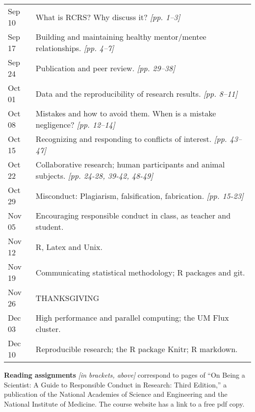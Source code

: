 \documentclass[11pt]{article}\usepackage[]{graphicx}\usepackage[]{color}
\begin{document}
\begin{tabular}{|ll|}
   \hline
Sep 10 & What is RCRS? Why discuss it? \em{[pp. 1--3]} \\ 
  Sep 17 & Building and maintaining healthy mentor/mentee relationships. \em{[pp. 4--7]} \\ 
  Sep 24 & Publication and peer review. \em{[pp. 29--38]} \\ 
  Oct 01 & Data and the reproducibility of research results. \em{[pp. 8--11]} \\ 
  Oct 08 & Mistakes and how to avoid them. When is a mistake negligence? \em{[pp. 12--14]} \\ 
  Oct 15 & Recognizing and responding to conflicts of interest. \em{[pp. 43--47]} \\ 
  Oct 22 & Collaborative research; human participants and animal subjects. \em{[pp. 24-28, 39-42, 48-49]} \\ 
  Oct 29 & Misconduct: Plagiarism, falsification, fabrication. \em{[pp. 15-23]} \\ 
  Nov 05 & Encouraging responsible conduct in class, as teacher and student. \\ 
  Nov 12 & R, Latex and Unix. \\ 
  Nov 19 & Communicating statistical methodology; R packages and git. \\ 
  Nov 26 & THANKSGIVING \\ 
  Dec 03 & High performance and parallel computing; the UM Flux cluster. \\ 
  Dec 10 & Reproducible research; the R package Knitr; R markdown. \\ 
   \hline
\end{tabular}


{\bf Reading assignments} {\em [in brackets, above]} correspond to pages of ``On Being a Scientist: A Guide to Responsible Conduct in Research: Third Edition,'' a publication of the National Academies of Science and Engineering and the National Institute of Medicine. The course website has a link to a free pdf copy.
\end{document}
